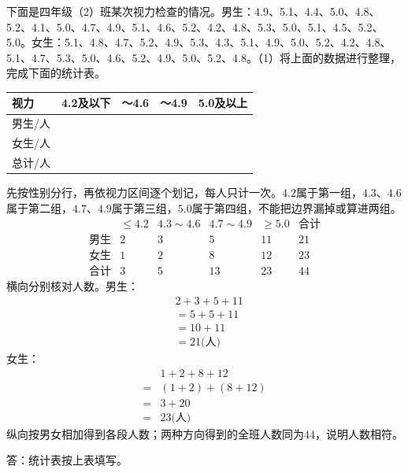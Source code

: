 下面是四年级（2）班某次视力检查的情况。男生：4.9、5.1、4.4、5.0、4.8、5.2、4.1、5.0、4.7、4.9、5.1、4.6、5.2、4.2、4.8、5.3、5.0、5.1、4.5、5.2、5.0。女生：5.1、4.8、4.7、5.2、4.9、5.3、4.3、5.1、4.9、5.0、5.2、4.2、4.8、5.1、4.7、5.3、5.0、4.6、5.2、4.9、5.0、5.2、4.8。（1）将上面的数据进行整理，完成下面的统计表。\par
\par\smallskip{}\begingroup\small\setlength{\tabcolsep}{3pt}
\noindent\begin{tabularx}{\linewidth}{|*{5}{>{\centering\arraybackslash}X|}}\hline
视力 & 4.2及以下 & 4.3～4.6 & 4.7～4.9 & 5.0及以上\\\hline
男生/人 &  &  &  & \\\hline
女生/人 &  &  &  & \\\hline
总计/人 &  &  &  & \\\hline
\end{tabularx}\par
\endgroup\smallskip
\begin{BookAnswer}
先按性别分行，再依视力区间逐个划记，每人只计一次。\(4.2\)属于第一组，\allowbreak{}\(4.3\)、\(4.6\)属于第二组，\allowbreak{}\(4.7\)、\(4.9\)属于第三组，\allowbreak{}\(5.0\)属于第四组，不能把边界漏掉或算进两组。\[\begin{array}{c|rrrr|r}&\le4.2&4.3\sim4.6&4.7\sim4.9&\ge5.0&\text{合计}\\\hline\text{男生}&2&3&5&11&21\\\text{女生}&1&2&8&12&23\\\text{合计}&3&5&13&23&44\end{array}\]横向分别核对人数。男生：\[\begin{aligned}&2+3+5+11\\&=5+5+11\\&=10+11\\&=21\text{(人)}\end{aligned}\]女生：\[\begin{aligned}&1+2+8+12\\={}&(1+2)+(8+12)\\={}&3+20\\={}&23\text{(人)}\end{aligned}\]纵向按男女相加得到各段人数；两种方向得到的全班人数同为\(44\)，说明人数相符。\par 答：统计表按上表填写。
\end{BookAnswer}

